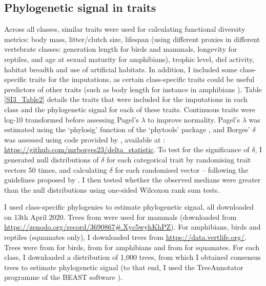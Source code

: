 \subsection{Phylogenetic signal in traits}
Across all classes, similar traits were used for calculating functional diversity metrics: body mass, litter/clutch size, lifespan (using different proxies in different vertebrate classes: generation length for birds and mammals, longevity for reptiles, and age at sexual maturity for amphibians), trophic level, diel activity, habitat breadth and use of artificial habitats. In addition, I included some class-specific traits for the imputations, as certain class-specific traits could be useful predictors of other traits (such as body length for instance in amphibians \citep{Santini2018}). Table \ref{SI3_Table2} details the traits that were included for the imputations in each class and the phylogenetic signal for each of these traits. Continuous traits were log-10 transformed before assessing Pagel’s $\lambda$ to improve normality. Pagel’s $\lambda$ was estimated using the `phylosig' function of the `phytools' package \citep{Revell2012}, and Borges’ $\delta$ was assessed using code provided by \citet{Borges2018}, available at : \url{https://github.com/mrborges23/delta_statistic}. To test for the significance of $\delta$, I generated null distributions of $\delta$ for each categorical trait by randomising trait vectors 50 times, and calculating $\delta$ for each randomised vector – following the guidelines proposed by \citet{Borges2018}. I then tested whether the observed medians were greater than the null distributions using one-sided Wilcoxon rank sum tests.

I used class-specific phylogenies to estimate phylogenetic signal, all downloaded on 13th April 2020. Trees from \citet{Faurby2018, Faurby2020}  were used for mammals (downloaded from \url{https://zenodo.org/record/3690867#.Xyc5wyhKhPZ}). For amphibians, birds and reptiles (squamates only), I downloaded trees from \url{https://data.vertlife.org/}. Trees were from \citet{Jetz2012} for birds, from \citet{Jetz2018} for amphibians and from \citet{Tonini2016} for squamates. For each class, I downloaded a distribution of 1,000 trees, from which I obtained consensus trees to estimate phylogenetic signal (to that end, I used the TreeAnnotator programme of the BEAST software \citep{Bouckaert2014}).


